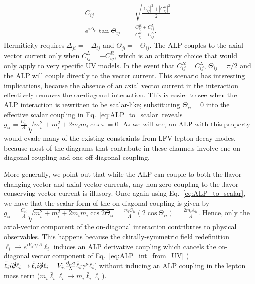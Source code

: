 \begin{align}
    C_{ij} &= \sqrt{\frac{|C_{ij}^L|^2 + |C_{ij}^R|^2}{2}}\\
    e^{i\Delta_{ij}}\tan{\Theta_{ij}} &= \frac{C_{ij}^R + C_{ij}^L}{C_{ij}^R - C_{ij}^L}.
\end{align}
Hermiticity requires $\Delta_{ji} = -\Delta_{ij}$ and $\Theta_{ji} = -\Theta_{ij}$. The ALP couples to the axial-vector current only when $C_{ij}^L = -C_{ij}^R$, which is an arbitrary choice that would only apply to very specific UV models. In the event that $C_{ij}^R = C_{ij}^L$, $\Theta_{ij} = \pi/2$ and the ALP will couple directly to the vector current. This scenario has interesting implications, because the absence of an axial vector current in the interaction effectively removes the on-diagonal interaction. This is easier to see when the ALP interaction is rewritten to be scalar-like; substituting $\Theta_{ii} = 0$ into the effective scalar coupling in Eq.~\ref{eq:ALP_to_scalar} reveals $g_{ii} = \frac{C_{ii}}{\Lambda}\sqrt{m_i^2 + m_i^2 + 2m_i m_i \cos{\pi}} = 0$. As we will see, an ALP with this property would evade many of the existing constraints from LFV lepton decay modes, because most of the diagrams that contribute in these channels involve one on-diagonal coupling and one off-diagonal coupling.

More generally, we point out that while the ALP can couple to both the flavor-changing vector and axial-vector currents, any non-zero coupling to the flavor-conserving vector current is illusory. Once again using Eq.~\ref{eq:ALP_to_scalar}, we have that the scalar form of the on-diagonal coupling is given by $g_{ii} = \frac{C_{ii}}{\Lambda}\sqrt{m_i^2 + m_i^2 + 2m_im_i\cos{2\Theta_{ii}}} = \frac{m_iC_{ii}}{\Lambda}(2\cos{\Theta_{ii}}) = \frac{2m_i A_{ii}}{\Lambda}$. Hence, only the axial-vector component of the on-diagonal interaction contributes to physical observables. This happens because the chirally-symmetric field redefinition $\ell_i \rightarrow e^{iV_{ii} a/\Lambda}\ell_i$ induces an ALP derivative coupling which cancels the on-diagonal vector component of Eq.~\ref{eq:ALP_int_from_UV}
($\bar{\ell}_ii\slashed{\partial}\ell_i \rightarrow \bar{\ell}_ii\slashed{\partial}\ell_i - V_{ii}\frac{\partial_\mu a}{\Lambda} \bar{\ell}_i\gamma^\mu \ell_i$) without inducing an ALP coupling in the lepton mass term ($m_i\bar{\ell}_i\ell_i\rightarrow m_i \bar{\ell}_i\ell_i$).

